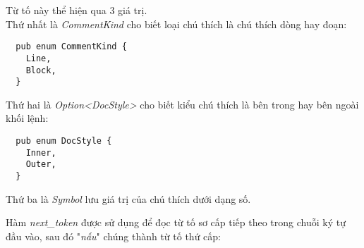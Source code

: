 \begin{itemize}
        Từ tố này thể hiện qua 3 giá trị. 
        \\Thứ nhất là \textit{CommentKind} cho biết loại chú thích là chú thích dòng hay đoạn:
  \begin{lstlisting}
  pub enum CommentKind {
    Line,
    Block,
  }
  \end{lstlisting}
        Thứ hai là \textit{Option<DocStyle>} cho biết kiểu chú thích là bên trong hay bên ngoài khối lệnh:
  \begin{lstlisting}
  pub enum DocStyle {
    Inner,
    Outer,
  }
  \end{lstlisting}
        Thứ ba là \textit{Symbol} lưu giá trị của chú thích dưới dạng số.
\end{itemize}

Hàm \textit{next\_token} được sử dụng để đọc từ tố sơ cấp tiếp theo trong chuỗi ký tự đầu vào, sau đó "\textit{nấu}" chúng thành từ tố thứ cấp:

